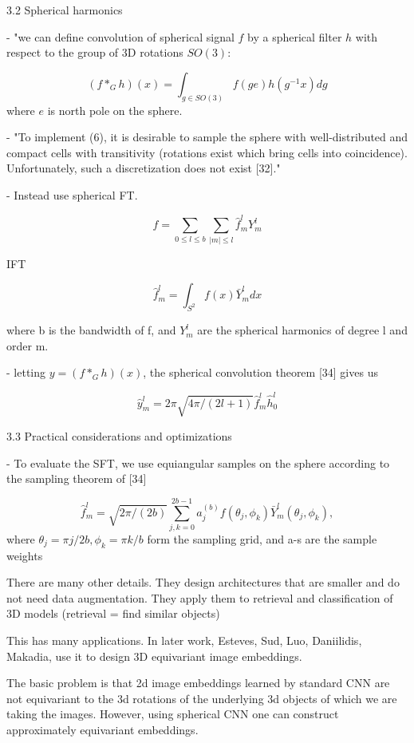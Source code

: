 \documentclass[english]{article}
\begin{document}
\item 3.2 Spherical harmonics

- "we can define convolution of spherical
signal $f$ by a spherical filter $h$ with respect to the group of 3D rotations $SO(3)$:

$$(f *_G h)(x) = \int_{g\in SO(3)} f(ge)h(g^{-1}x)dg$$
where $e$  is north pole on the sphere.

- "To implement (6), it is desirable to sample the sphere with well-distributed
and compact cells with transitivity (rotations exist which bring cells into coincidence). Unfortunately, such a discretization does not exist [32]."

- Instead use spherical FT. 

$$f = \sum_{0\le l \le b} \sum_{|m|\le l}
\hat f^l_m Y^l_m$$

IFT

$$\hat f^l_m = \int_{S^2} f(x)\bar Y^l_m dx$$

where b is the bandwidth of f, and $Y^l_m$
are the spherical harmonics of degree l
and order m.

-  letting $y = (f *_G h)(x)$, the spherical
convolution theorem [34] gives us

$$\hat y_m^l = 2\pi
\sqrt{4\pi/(2l + 1)}
\hat f^l_m
\hat h^l_0
$$

\item 3.3 Practical considerations and optimizations

- To evaluate the SFT, we use equiangular samples on the sphere according to the
sampling theorem of [34]

$$
\hat f^l_m =
\sqrt{2\pi/(2b)}
\sum^{2b-1}_{j,k=0}
a^{(b)}_j
f(\theta_j ,\phi_k)
\bar Y^l_m(\theta_j ,\phi_k),
$$
where $\theta_j = \pi j/2b,\phi_k=\pi k / b$  form the sampling grid, and a-s are the
sample weights


\item 
There are many other details. They design architectures that are smaller and do not need data augmentation. They apply them to retrieval and classification of 3D models (retrieval = find similar objects)

\eenum 
\item This has many applications. In later work, Esteves, Sud, Luo, Daniilidis, Makadia, use it to design 3D equivariant image embeddings. 

The basic problem is that 2d image embeddings learned by standard CNN are not equivariant to the 3d rotations of the underlying 3d objects of which we are taking the images. However, using spherical CNN one can construct approximately equivariant embeddings. 
\end{document}
